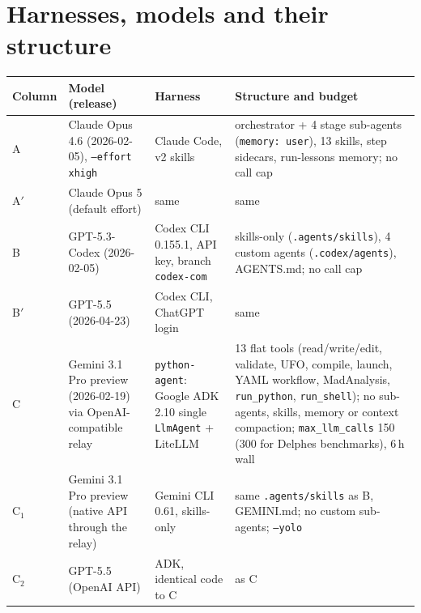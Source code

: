 \documentclass[10pt,a4paper]{article}
\newcommand{\code}[1]{\texttt{#1}}
\begin{document}
\section{Harnesses, models and their structure}
\begin{center}\scriptsize\setlength{\tabcolsep}{3pt}
\begin{tabular}{lp{3.3cm}p{4.2cm}p{7.0cm}}
\toprule
Column & Model (release) & Harness & Structure and budget \\
\midrule
A & Claude Opus 4.6 (2026-02-05), \code{--effort xhigh} & Claude Code, v2 skills & orchestrator + 4 stage sub-agents (\code{memory: user}), 13 skills, step sidecars, run-lessons memory; no call cap \\
A$'$ & Claude Opus 5 (default effort) & same & same \\
B & GPT-5.3-Codex (2026-02-05) & Codex CLI 0.155.1, API key, branch \code{codex-com} & skills-only (\code{.agents/skills}), 4 custom agents (\code{.codex/agents}), AGENTS.md; no call cap \\
B$'$ & GPT-5.5 (2026-04-23) & Codex CLI, ChatGPT login & same \\
C & Gemini 3.1 Pro preview (2026-02-19) via OpenAI-compatible relay & \code{python-agent}: Google ADK 2.10 single \code{LlmAgent} + LiteLLM & 13 flat tools (read/write/edit, validate, UFO, compile, launch, YAML workflow, MadAnalysis, \code{run\_python}, \code{run\_shell}); no sub-agents, skills, memory or context compaction; \code{max\_llm\_calls} 150 (300 for Delphes benchmarks), 6\,h wall \\
C$_1$ & Gemini 3.1 Pro preview (native API through the relay) & Gemini CLI 0.61, skills-only & same \code{.agents/skills} as B, GEMINI.md; no custom sub-agents; \code{--yolo} \\
C$_2$ & GPT-5.5 (OpenAI API) & ADK, identical code to C & as C \\
\bottomrule
\end{tabular}
\end{center}
\end{document}

